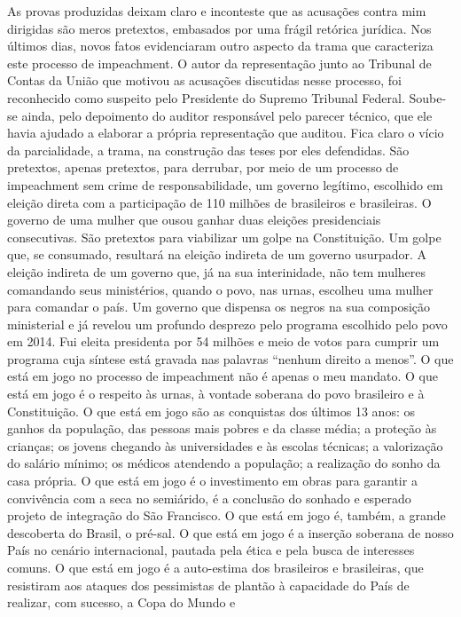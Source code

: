 As provas produzidas deixam claro e inconteste que as acusações contra
mim dirigidas são meros pretextos, embasados por uma frágil retórica
jurídica. Nos últimos dias, novos fatos evidenciaram outro aspecto da
trama que caracteriza este processo de impeachment. O autor da
representação junto ao Tribunal de Contas da União que motivou as
acusações discutidas nesse processo, foi reconhecido como suspeito pelo
Presidente do Supremo Tribunal Federal. Soube-se ainda, pelo depoimento
do auditor responsável pelo parecer técnico, que ele havia ajudado a
elaborar a própria representação que auditou. Fica claro o vício da
parcialidade, a trama, na construção das teses por eles defendidas. São
pretextos, apenas pretextos, para derrubar, por meio de um processo de
impeachment sem crime de responsabilidade, um governo legítimo,
escolhido em eleição direta com a participação de 110 milhões de
brasileiros e brasileiras. O governo de uma mulher que ousou ganhar duas
eleições presidenciais consecutivas. São pretextos para viabilizar um
golpe na Constituição. Um golpe que, se consumado, resultará na eleição
indireta de um governo usurpador. A eleição indireta de um governo que,
já na sua interinidade, não tem mulheres comandando seus ministérios,
quando o povo, nas urnas, escolheu uma mulher para comandar o país. Um
governo que dispensa os negros na sua composição ministerial e já
revelou um profundo desprezo pelo programa escolhido pelo povo em 2014.
Fui eleita presidenta por 54 milhões e meio de votos para cumprir um
programa cuja síntese está gravada nas palavras ``nenhum direito a
menos''. O que está em jogo no processo de impeachment não é apenas o
meu mandato. O que está em jogo é o respeito às urnas, à vontade
soberana do povo brasileiro e à Constituição. O que está em jogo são as
conquistas dos últimos 13 anos: os ganhos da população, das pessoas mais
pobres e da classe média; a proteção às crianças; os jovens chegando às
universidades e às escolas técnicas; a valorização do salário mínimo; os
médicos atendendo a população; a realização do sonho da casa própria. O
que está em jogo é o investimento em obras para garantir a convivência
com a seca no semiárido, é a conclusão do sonhado e esperado projeto de
integração do São Francisco. O que está em jogo é, também, a grande
descoberta do Brasil, o pré-sal. O que está em jogo é a inserção
soberana de nosso País no cenário internacional, pautada pela ética e
pela busca de interesses comuns. O que está em jogo é a auto-estima dos
brasileiros e brasileiras, que resistiram aos ataques dos pessimistas de
plantão à capacidade do País de realizar, com sucesso, a Copa do Mundo e
